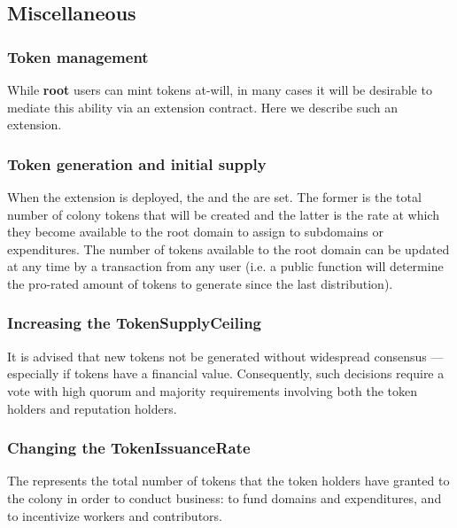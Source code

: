 \subsection{Miscellaneous}\label{sec:extensions-misc}

\subsubsection{Token management}\label{sec:colony-token-management}

While \textbf{root} users can mint tokens at-will, in many cases it will be desirable to mediate this ability via an extension contract. Here we describe such an extension.

\subsubsection*{Token generation and initial supply}

When the extension is deployed, the  and the  are set. The former is the total number of colony tokens that will be created and the latter is the rate at which they become available to the root domain to assign to subdomains or expenditures. The number of tokens available to the root domain can be updated at any time by a transaction from any user (i.e. a public function will determine the pro-rated amount of tokens to generate since the last distribution).

\subsubsection*{Increasing the TokenSupplyCeiling}

 It is advised that new tokens not be generated without widespread consensus --- especially if tokens have a financial value. Consequently, such decisions require a vote with high quorum and majority requirements involving both the token holders and reputation holders.

\subsubsection*{Changing the TokenIssuanceRate}

The  represents the total number of tokens that the token holders have granted to the colony in order to conduct business: to fund domains and expenditures, and to incentivize workers and contributors.

